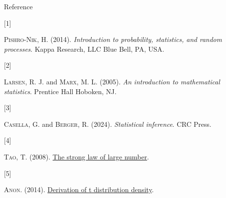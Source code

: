 \documentclass[
  ignorenonframetext,
  aspectratio=43,
]{beamer}
\newlength{\cslhangindent}
\newlength{\csllabelwidth}
\newenvironment{CSLReferences}[2] %
 {\begin{list}{}{%
  \setlength{\itemindent}{0pt}
  \setlength{\leftmargin}{0pt}
  \setlength{\parsep}{0pt}
  \ifodd #1
   \setlength{\leftmargin}{\cslhangindent}
   \setlength{\itemindent}{-1\cslhangindent}
  \fi
  \setlength{\itemsep}{#2\baselineskip}}}
 {\end{list}}
\newcommand{\CSLLeftMargin}[1]{\parbox[t]{\csllabelwidth}{\strut#1\strut}}
\newcommand{\CSLRightInline}[1]{\parbox[t]{\linewidth - \csllabelwidth}{\strut#1\strut}}
\begin{document}
\begin{frame}{Reference}
\label{reference}
\label{refs}
\begin{CSLReferences}{0}{1}
\CSLLeftMargin{{[}1{]} }%
\CSLRightInline{\textsc{Pishro-Nik}, H. (2014). \emph{Introduction to
probability, statistics, and random processes}. Kappa Research, LLC Blue
Bell, PA, USA.}

\CSLLeftMargin{{[}2{]} }%
\CSLRightInline{\textsc{Larsen}, R. J. and \textsc{Marx}, M. L. (2005).
\emph{An introduction to mathematical statistics}. Prentice Hall
Hoboken, NJ.}

\CSLLeftMargin{{[}3{]} }%
\CSLRightInline{\textsc{Casella}, G. and \textsc{Berger}, R. (2024).
\emph{Statistical inference}. CRC Press.}

\CSLLeftMargin{{[}4{]} }%
\CSLRightInline{\textsc{Tao}, T. (2008).
\href{https://terrytao.wordpress.com/2008/06/18/the-strong-law-of-large-numbers/}{The
strong law of large number}.}

\CSLLeftMargin{{[}5{]} }%
\CSLRightInline{\textsc{Anon}. (2014).
\href{https://math.stackexchange.com/questions/474733/derivation-of-the-density-function-of-student-t-distribution-from-this-big-integ}{Derivation
of t distribution density}.}

\end{CSLReferences}
\end{frame}
\end{document}

